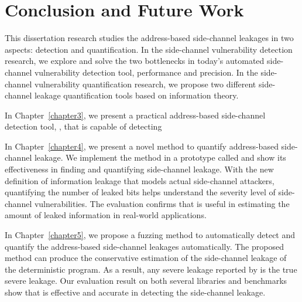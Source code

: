\chapter{Conclusion and Future Work}\label{chapter6}
This dissertation research studies the address-based side-channel leakages in two aspects: detection and quantification. In the side-channel vulnerability detection research, we explore and solve the two bottlenecks in today's automated side-channel vulnerability detection tool, performance and precision. In the side-channel vulnerability quantification research, we propose two different side-channel leakage quantification tools based on information theory. 

In Chapter~\ref{chapter3}, we present a practical address-based side-channel detection tool, \detect{}, that is capable of detecting 

In Chapter~\ref{chapter4}, we present a novel method to quantify address-based side-channel leakage. We implement the method in a prototype called \tool{} and show its effectiveness in finding and quantifying side-channel leakage. With the new definition of information leakage that models actual side-channel attackers, quantifying the number of leaked bits helps understand the severity level of side-channel vulnerabilities. The evaluation confirms that \tool{} is useful in estimating the amount of leaked information in real-world applications.

In Chapter~\ref{chapter5}, we propose a fuzzing method to automatically detect and quantify the address-based side-channel leakages automatically. The proposed method can produce the conservative estimation of the side-channel leakage of the deterministic program. As a result, any severe leakage reported by \ctool{} is the true severe leakage. Our evaluation result on both several libraries and benchmarks show that \ctool{} is effective and accurate in detecting the side-channel leakage.

